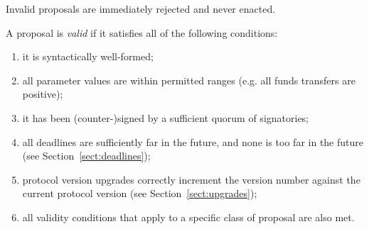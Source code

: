 Invalid proposals are immediately rejected and never enacted.

A proposal is \emph{valid} if it satisfies all of the following conditions:

\begin{enumerate}
\item
  it is syntactically well-formed;
\item
  all parameter values are within permitted ranges (e.g. all funds transfers are positive);
\item
  it has been (counter-)signed by a sufficient quorum of signatories;
\item
  all deadlines are sufficiently far in the future, and none is too far in the future (see Section~\ref{sect:deadlines});
\item
  protocol version upgrades correctly increment the version number against the current protocol version (see Section~\ref{sect:upgrades});
\item
  all validity conditions that apply to a specific class of proposal are also met.
\end{enumerate}
